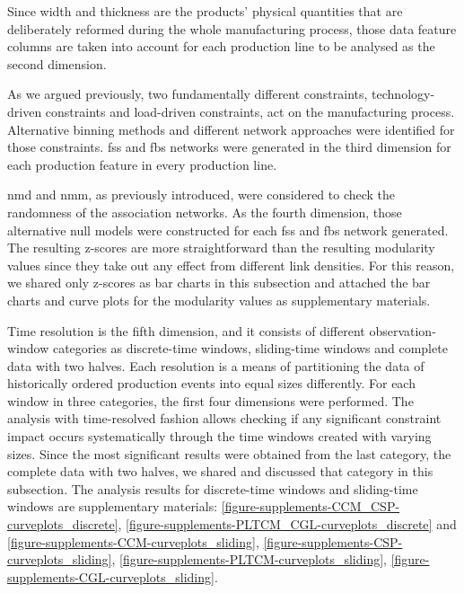 Since width and thickness are the products' physical quantities that are deliberately reformed during the whole manufacturing process, those data feature columns are taken into account for each production line to be analysed as the second dimension. 

As we argued previously, two fundamentally different constraints, technology-driven constraints and load-driven constraints, act on the manufacturing process. Alternative binning methods and different network approaches were identified for those constraints. \acs{fss} and \acs{fbs} networks were generated in the third dimension for each production feature in every production line.

\acs{nmd} and \acs{nmm}, as previously introduced, were considered to check the randomness of the association networks. As the fourth dimension, those alternative null models were constructed for each \acs{fss} and \acs{fbs} network generated. The resulting z-scores are more straightforward than the resulting modularity values since they take out any effect from different link densities. For this reason, we shared only z-scores as bar charts in this subsection and attached the bar charts and curve plots for the modularity values as supplementary materials.

Time resolution is the fifth dimension, and it consists of different observation-window categories as discrete-time windows, sliding-time windows and complete data with two halves. Each resolution is a means of partitioning the data of historically ordered production events into equal sizes differently. For each window in three categories, the first four dimensions were performed. The analysis with time-resolved fashion allows checking if any significant constraint impact occurs systematically through the time windows created with varying sizes. Since the most significant results were obtained from the last category, the complete data with two halves, we shared and discussed that category in this subsection. The analysis results for discrete-time windows and sliding-time windows are supplementary materials: \ref{figure-supplements-CCM_CSP-curveplots_discrete}, \ref{figure-supplements-PLTCM_CGL-curveplots_discrete} and \ref{figure-supplements-CCM-curveplots_sliding}, \ref{figure-supplements-CSP-curveplots_sliding}, \ref{figure-supplements-PLTCM-curveplots_sliding}, \ref{figure-supplements-CGL-curveplots_sliding}.

